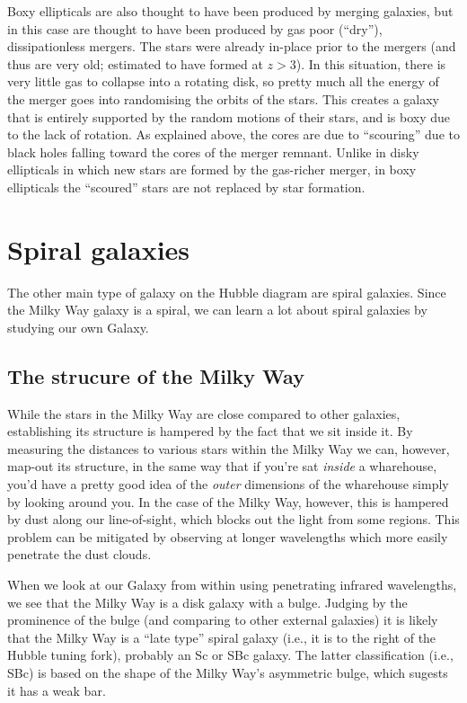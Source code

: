 \documentclass[11pt]{article}
\begin{document}
Boxy ellipticals are also thought to have been produced by merging
galaxies, but in this case are thought to have been produced by gas
poor (``dry''), dissipationless mergers. The stars were already
in-place prior to the mergers (and thus are very old; estimated to
have formed at $z>3$). In this situation, there is very little gas to
collapse into a rotating disk, so pretty much all the energy of the
merger goes into randomising the orbits of the stars. This creates a
galaxy that is entirely supported by the random motions of their
stars, and is boxy due to the lack of rotation. As explained above,
the cores are due to ``scouring'' due to black holes falling toward
the cores of the merger remnant. Unlike in disky ellipticals in which
new stars are formed by the gas-richer merger, in boxy ellipticals the
``scoured'' stars are not replaced by star formation.

\section{Spiral galaxies}
The other main type of galaxy on the Hubble diagram are spiral
galaxies. Since the Milky Way galaxy is a spiral, we can learn a lot
about spiral galaxies by studying our own Galaxy.

\subsection{The strucure of the Milky Way}
While the stars in the Milky Way are close compared to other galaxies,
establishing its structure is hampered by the fact that we sit inside
it. By measuring the distances to various stars within the Milky Way
we can, however, map-out its structure, in the same way that if you're
sat {\it inside} a wharehouse, you'd have a pretty good idea of the
{\it outer} dimensions of the wharehouse simply by looking around
you. In the case of the Milky Way, however, this is hampered by dust
along our line-of-sight, which blocks out the light from some
regions. This problem can be mitigated by observing at longer
wavelengths which more easily penetrate the dust clouds.

When we look at our Galaxy from within using penetrating infrared
wavelengths, we see that the Milky Way is a disk galaxy with a
bulge. Judging by the prominence of the bulge (and comparing to other
external galaxies) it is likely that the Milky Way is a ``late type''
spiral galaxy (i.e., it is to the right of the Hubble tuning fork),
probably an Sc or SBc galaxy. The latter classification (i.e., SBc) is
based on the shape of the Milky Way's asymmetric bulge, which sugests
it has a weak bar.
\end{document}
